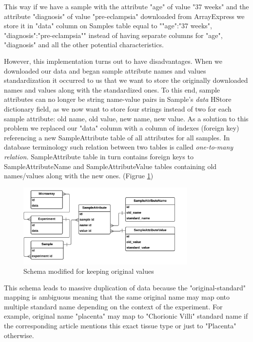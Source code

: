 \documentclass[conference]{IEEEtran}
\begin{document}
This way if we have a sample with the attribute "age" of value "37 weeks" and the attribute "diagnosis" of value "pre-eclampsia" downloaded from ArrayExpress we store it in "data" column on Samples table equal to "{"age":"37 weeks", "diagnosis":"pre-eclampsia"}" instead of having separate columns for "age", "diagnosis" and all the other potential characteristics.

However, this implementation turns out to have disadvantages. When we downloaded our data and began sample attribute names and values standardization it occurred to us that we want to store the originally downloaded names and values along with the standardized ones. To this end, sample attributes can no longer be string name-value pairs in Sample's \textit{data} HStore dictionary field, as we now want to store four strings instead of two for each sample attribute: old name, old value, new name, new value. As a solution to this problem we replaced our "data" column with a column of indexes (foreign key) referencing a new  SampleAttribute table of all attributes for all samples. In database terminology such relation between two tables is called \textit{one-to-many relation.} SampleAttribute table in turn contains foreign keys to SampleAttributeName and SampleAttributeValue tables containing old names/values along with the new ones. (Figrue \ref{fig:KeepOldSchema})

\begin{figure}[h]
        \includegraphics[width=3.5in]{plots/KeepOldSchema}
        \caption{Schema modified for keeping original values}
        \label{fig:KeepOldSchema}
\end{figure}

This schema leads to massive duplication of data because the "original-standard" mapping is ambiguous meaning that the same original name may map onto multiple standard name depending on the context of the experiment. For example, original name "placenta" may map to "Chorionic Villi" standard name if the corresponding article mentions this exact tissue type or just to "Placenta" otherwise.
\end{document}
